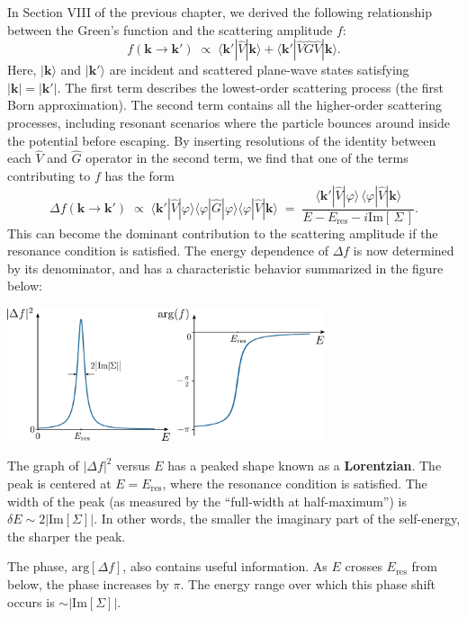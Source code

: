 \documentclass[pra,12pt]{revtex4}
\begin{document}
In Section VIII of the previous chapter, we derived the following
relationship between the Green's function and the scattering amplitude
$f$:
$$f(\mathbf{k}\rightarrow\mathbf{k}') \;\propto\; \langle \mathbf{k}'|\hat{V}|\mathbf{k}\rangle + \langle \mathbf{k}'|\hat{V}\hat{G}\hat{V}|\mathbf{k}\rangle.$$
Here, $|\mathbf{k}\rangle$ and $|\mathbf{k}'\rangle$ are incident and
scattered plane-wave states satisfying $|\mathbf{k}|=|\mathbf{k}'|$.
The first term describes the lowest-order scattering process (the
first Born approximation).  The second term contains all the
higher-order scattering processes, including resonant scenarios where
the particle bounces around inside the potential before escaping.
By inserting resolutions of the identity between each $\hat{V}$ and
$\hat{G}$ operator in the second term, we find that one of the terms
contributing to $f$ has the form
$$\Delta f(\mathbf{k}\rightarrow\mathbf{k}') \;\propto\; \langle \mathbf{k}'|\hat{V}|\varphi\rangle\langle\varphi|\hat{G}|\varphi\rangle\langle\varphi|\hat{V}|\mathbf{k}\rangle \;=\; \frac{\langle \mathbf{k}'|\hat{V}|\varphi\rangle \, \langle\varphi|\hat{V}|\mathbf{k}\rangle}{\displaystyle E - E_{\mathrm{res}} - i \mathrm{Im}[\,\Sigma\,]}.$$
This can become the dominant contribution to the scattering amplitude
if the resonance condition is satisfied.  The energy dependence of
$\Delta f$ is now determined by its denominator, and has a
characteristic behavior summarized in the figure below:

\begin{center}
  \includegraphics[width=0.7\textwidth]{resonance}  
\end{center}

The graph of $|\Delta f|^2$ versus $E$ has a peaked shape known as a
\textbf{Lorentzian}.  The peak is centered at $E = E_{\mathrm{res}}$,
where the resonance condition is satisfied.  The width of the peak (as
measured by the ``full-width at half-maximum'') is $\delta E \sim
2|\mathrm{Im}[\Sigma]|$.  In other words, the smaller the imaginary
part of the self-energy, the sharper the peak.

The phase, $\mathrm{arg}[\Delta f]$, also contains useful information.
As $E$ crosses $E_{\mathrm{res}}$ from below, the phase increases by
$\pi$.  The energy range over which this phase shift occurs is $\sim
|\mathrm{Im}[\Sigma]|$.
\end{document}
